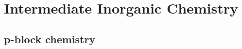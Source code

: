 \documentclass{article}
\begin{document}
    \section{Intermediate Inorganic Chemistry}
    \subsection{p-block chemistry }
\end{document}
